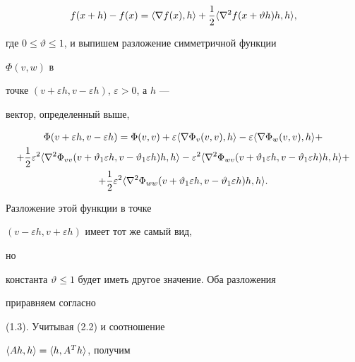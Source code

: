 $$


f(x+h)-f(x)=\la\nabla f(x),h\ra+


\frac{1}{2}\la\nabla^2f(x+\vartheta h)h,h\ra,


$$


где $0\le\vartheta\le 1$, и выпишем разложение симметричной функции


$\Phi(v,w)$ в


точке $(v+\varepsilon h,v-\varepsilon h)$, $\varepsilon>0$, а $h$ ---


вектор, определенный выше,


\begin{multline*}


\Phi(v+\varepsilon h,v-\varepsilon h)=\Phi(v,v)+


\varepsilon\la\nabla\Phi_v(v,v),h\ra-


\varepsilon\la\nabla\Phi_w(v,v),h\ra+ \\


%


+\frac{1}{2}\varepsilon^2\la\nabla^2\Phi_{vv}


(v+\vartheta_1\varepsilon h,v-\vartheta_1\varepsilon h)h,h\ra-


\varepsilon^2\la\nabla^2\Phi_{wv}


(v+\vartheta_1\varepsilon h,v-\vartheta_1\varepsilon h)h,h\ra+\\


%


+\frac{1}{2}\varepsilon^2


\la\nabla^2\Phi_{ww}(v+\vartheta_1\varepsilon h,


v-\vartheta_1\varepsilon h)h,h\ra.


\end{multline*}


Разложение этой функции в точке


$(v-\varepsilon h,v+\varepsilon h)$ имеет тот же самый вид,


но


константа $\vartheta\le 1$ будет иметь другое значение. Оба разложения


приравняем согласно


(1.3). Учитывая (2.2) и соотношение


$\langle Ah,h\rangle=\langle h,A^Th\rangle$, получим


